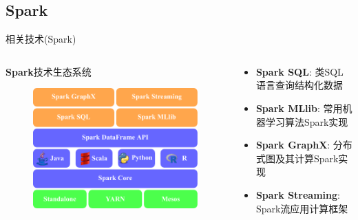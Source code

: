 \subsection{Spark}

\begin{frame}[c]{相关技术(Spark)}
    \begin{columns}
        \begin{column}{0.5 \textwidth}
            \textbf{Spark}技术生态系统

            \vspace{0.5em}
            \begin{figure}
                \centering
                \includegraphics[scale=0.6]{figures/spark.pdf}
            \end{figure}            
        \end{column}

        
        \pause
        \begin{column}{0.5 \textwidth}
            \begin{itemize}
                \item \textbf{Spark SQL}: 类SQL语言查询结构化数据
                \item \textbf{Spark MLlib}: 常用机器学习算法Spark实现
                \item \textbf{Spark GraphX}: 分布式图及其计算Spark实现
                \item \textbf{Spark Streaming}: Spark流应用计算框架
            \end{itemize}
        \end{column}
    \end{columns}
\end{frame}


